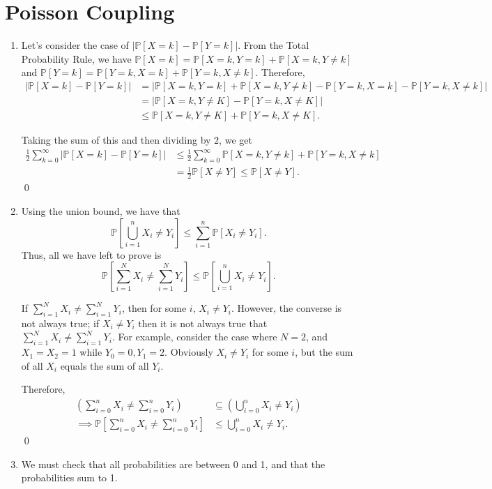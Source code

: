 \documentclass{article}
\newcommand{\p}{\mathbb{P}}
\begin{document}
\section{Poisson Coupling}
\begin{enumerate}[label=(\alph*)]
	\item Let's consider the case of $|\p[X = k] - \p[Y = k]|$. From the Total Probability Rule, we have $\p[X = k] = \p[X = k, Y = k] + \p[X = k, Y \neq k]$ and $\p[Y = k] = \p[Y = k, X = k] + \p[Y = k, X \neq k]$. Therefore, 
	\begin{align*}
		|\p[X = k] - \p[Y = k]| &= |\p[X = k, Y = k] + \p[X = k, Y \neq k] - \p[Y = k, X = k] - \p[Y = k, X \neq k]| \\
		&= |\p[X = k, Y \neq K] - \p[Y = k, X \neq K]| \\
		&\leq \p[X = k, Y \neq K] + \p[Y = k, X \neq K].
	\end{align*}

	Taking the sum of this and then dividing by $2$, we get 
	\begin{align*}
		\frac{1}{2} \sum_{k = 0}^\infty |\p[X = k] - \p[Y = k]| &\leq \frac{1}{2} \sum_{k = 0}^\infty \p[X = k, Y \neq k] + \p[Y = k, X \neq k] \\
		&= \frac{1}{2}\p[X \neq Y] \leq \p[X \neq Y].
	\end{align*}
	\qed
	\item Using the union bound, we have that $$\p\left[\bigcup_{i = 1}^n X_i \neq Y_i\right] \leq \sum_{i = 1}^n \p[X_i \neq Y_i].$$ Thus, all we have left to prove is $$\p\left[\sum_{i = 1}^N X_i \neq \sum_{i = 1}^N Y_i\right] \leq \p\left[\bigcup_{i = 1}^n X_i \neq Y_i\right].$$
	
	If $\sum_{i=1}^N X_i \neq \sum_{i=1}^N Y_i$, then for some $i$, $X_i \neq Y_i$. However, the converse is not always true; if $X_i \neq Y_i$ then it is not always true that $\sum_{i=1}^N X_i \neq \sum_{i=1}^N Y_i$. For example, consider the case where $N=2$, and $X_1 = X_2 = 1$ while $Y_0 = 0, Y_1 = 2$. Obviously $X_i \neq Y_i$ for some $i$, but the sum of all $X_i$ equals the sum of all $Y_i$.

	Therefore, 
	\begin{align*}
		(\sum_{i = 0}^n X_i \neq \sum_{i=0}^n Y_i) &\subseteq (\bigcup_{i = 0}^n X_i \neq Y_i) \\
		\implies \p[\sum_{i = 0}^n X_i \neq \sum_{i=0}^n Y_i] &\leq \bigcup_{i = 0}^n X_i \neq Y_i.
	\end{align*}\qed
	\item We must check that all probabilities are between 0 and 1, and that the probabilities sum to 1.
	

\end{enumerate}
\end{document}
